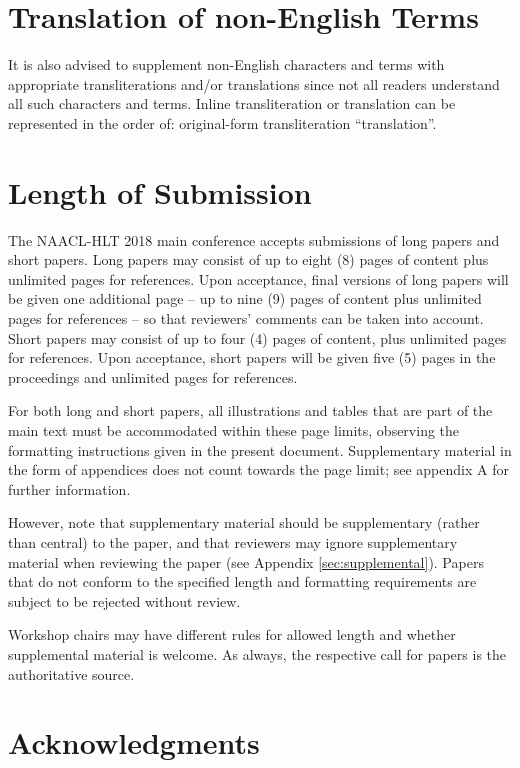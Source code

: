 \section{Translation of non-English Terms}

It is also advised to supplement non-English characters and terms
with appropriate transliterations and/or translations
since not all readers understand all such characters and terms.
Inline transliteration or translation can be represented in
the order of: original-form transliteration ``translation''.

\section{Length of Submission}
\label{sec:length}

The NAACL-HLT 2018 main conference accepts submissions of long papers and
short papers.
 Long papers may consist of up to eight (8) pages of
content plus unlimited pages for references. Upon acceptance, final
versions of long papers will be given one additional page -- up to nine (9)
pages of content plus unlimited pages for references -- so that reviewers' comments
can be taken into account. Short papers may consist of up to four (4)
pages of content, plus unlimited pages for references. Upon
acceptance, short papers will be given five (5) pages in the
proceedings and unlimited pages for references. 

For both long and short papers, all illustrations and tables that are part
of the main text must be accommodated within these page limits, observing
the formatting instructions given in the present document. Supplementary
material in the form of appendices does not count towards the page limit; see appendix A for further information.

However, note that supplementary material should be supplementary
(rather than central) to the paper, and that reviewers may ignore
supplementary material when reviewing the paper (see Appendix
\ref{sec:supplemental}). Papers that do not conform to the specified
length and formatting requirements are subject to be rejected without
review.

Workshop chairs may have different rules for allowed length and
whether supplemental material is welcome. As always, the respective
call for papers is the authoritative source.

\section*{Acknowledgments}


